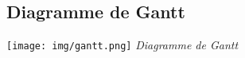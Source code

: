 \documentclass[hidelinks, 10pt,a4paper]{article}
\begin{document}
\begin{comment}
\subsection{Les itérations}
  \begin{itemize}
    \item \textbf{Livrable 1} : Disponible à la fin de la semaine 9, ce livrable sera la
      base de notre projet. Celui-ci comprendra une partie des fonctionnalités essentielles
      à un éditeur, ainsi qu'un modèle correspondant à la version finale du projet.
      Le temps de développement nécessaire à ce livrable a été estimé entre 115 à 145 heures.
    \item \textbf{Livrable 2} : Disponible à la fin de la semaine 14, le but de ce livrable
      sera d'implémenter l'interface homme-machine la plus fidèle à l'interface attendue à
      la fin du projet.
      Le temps de développement nécessaire à ce livrable a été estimé à environ 130 heures.
    \item \textbf{Livrable 3} : Disponible à la date limite du rendu de projet (semaine 18),
      l'objet de ce livrable sera l'ajout du diagramme de cas d'utilisation, et si possible, des
      fonctionnalités supplémentaires.
      Le temps de développement nécessaire à ce livrable a été estimé à environ 110 heures.
  \end{itemize}
\end{comment}

\newpage
\subsection{Diagramme de Gantt}
\begin{center}
  \texttt{[image: img/gantt.png]}
  \textit{Diagramme de Gantt}
\end{center}
\newpage
 
\end{document}
